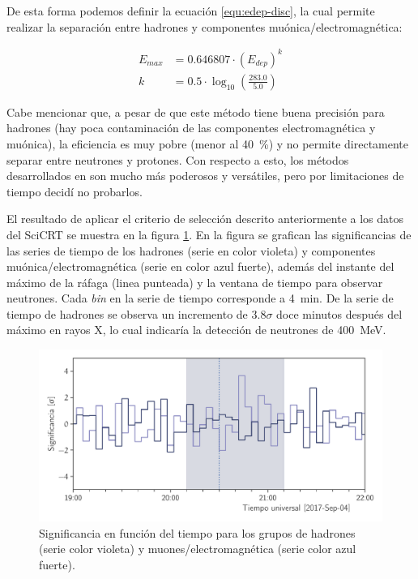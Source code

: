 De esta forma podemos definir la ecuación \ref{equ:edep-disc}, la cual permite realizar la separación entre hadrones y componentes muónica/electromagnética:

\begin{align}
\label{equ:edep-disc}
E_{max} &=0.646807\cdot (E_{dep})^{k}\\
k &=0.5\cdot\log_{10}\left(\frac{283.0}{5.0}\right) \nonumber
\end{align}

Cabe mencionar que, a pesar de que este método tiene buena precisión para hadrones (hay poca contaminación de las componentes electromagnética y muónica), la eficiencia es muy pobre (menor al \SI{40}{\percent}) y no permite directamente separar entre neutrones y protones. Con respecto a esto, los métodos desarrollados en \cite{garcia20} son mucho más poderosos y versátiles, pero por limitaciones de tiempo decidí no probarlos.

El resultado de aplicar el criterio de selección descrito anteriormente a los datos del SciCRT se muestra en la figura \ref{fig:september-04-disc}. En la figura se grafican las significancias de las series de tiempo de los hadrones (serie en color violeta) y componentes muónica/electromagnética (serie en color azul fuerte), además del instante del máximo de la ráfaga (linea punteada) y la ventana de tiempo para observar neutrones. Cada \emph{bin} en la serie de tiempo corresponde a \SI{4}{\minute}. De la serie de tiempo de hadrones se observa un incremento de $3.8\sigma$ doce minutos después del máximo en rayos X, lo cual indicaría la detección de neutrones de \SI{400}{\mega\electronvolt}.

\begin{figure}
        \centering
        \includegraphics[width=\textwidth]{significance-170904.pdf}
        \caption{Significancia en función del tiempo para los grupos de hadrones (serie color violeta) y muones/electromagnética (serie color azul fuerte).}
        \label{fig:september-04-disc}
\end{figure}

